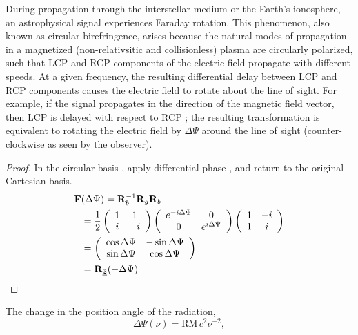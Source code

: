 During propagation
through the interstellar medium or the Earth's ionosphere, an astrophysical signal experiences Faraday rotation.
%
This phenomenon, also known as circular birefringence, arises because the natural modes of propagation in a magnetized (non-relativsitic and collisionless) plasma are circularly polarized, such that LCP and RCP components of the electric field propagate with different speeds.
%
At a given frequency, the resulting differential delay between LCP and RCP components causes the electric field to rotate about the line of sight.
%
For example, if 
the signal propagates in the direction of the magnetic field vector, then LCP is delayed with respect to RCP \citep{man72,2021MNRAS.507.4968F}; the resulting transformation
is equivalent to rotating the electric field by $\Delta\Psi$ around the line of sight (counter-clockwise as seen by the observer).
%
\begin{proof}
\label{proof:Faraday_rotation}
In the circular basis , apply differential phase , and return to the original Cartesian basis.  
\begin{align*}
\JM{F}&(\Delta\Psi)
 = \JM{R}_b^{-1} \JM{R}_g \JM{R}_b \\
&= \frac{1}{2}
    \left( \begin{array}{cc}
      1 & 1 \\
      i & -i
    \end{array} \right) 
%
    \left( \begin{array}{cc}
      e^{-\Ci \Delta\Psi} & 0 \\
      0 & e^{\Ci \Delta\Psi}
    \end{array} \right) 
%
    \left( \begin{array}{cc}
      1 & -i \\
      1 & i
    \end{array} \right) \\
%
&= \left( \begin{array}{cc}
      \cos\Delta\Psi & -\sin\Delta\Psi \\
      \sin\Delta\Psi & \cos\Delta\Psi
    \end{array} \right) \\
&= \vRotation[z](-\Delta\Psi)
\end{align*}
\end{proof}
%
The change in the position angle of the radiation,
\begin{equation}
    \label{eqn:Faraday_rotation}
    \Delta\Psi(\nu) = \mathrm{RM} \, c^2 \nu^{-2},
\end{equation}
